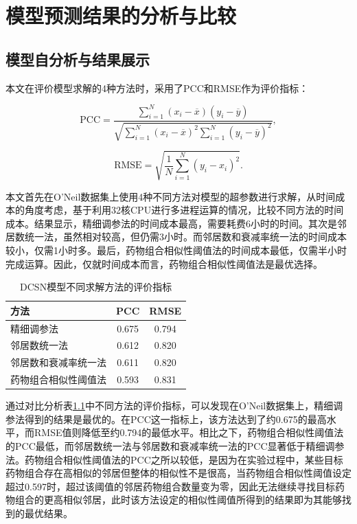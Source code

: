 \chapter{模型预测结果的分析与比较}
\label{chap:theory}

\section{模型自分析与结果展示}

本文在评价模型求解的4种方法时，采用了PCC和RMSE作为评价指标：

\begin{equation*}
\mathrm{PCC} = \frac{\sum_{i=1}^{N}(x_i-\overline{x})(y_i-\overline{y})}{\sqrt{\sum_{i=1}^{N}(x_i-\overline{x})^2\sum_{i=1}^{N}(y_i-\overline{y})^2}},
\end{equation*}

\begin{equation*}
\mathrm{RMSE} = \sqrt{\frac{1}{N} \sum_{i=1}^{N} (y_i - x_i)^2}.
\end{equation*}

本文首先在O'Neil数据集上使用4种不同方法对模型的超参数进行求解，从时间成本的角度考虑，基于利用32核CPU进行多进程运算的情况，比较不同方法的时间成本。结果显示，精细调参法的时间成本最高，需要耗费6小时的时间。其次是邻居数统一法，虽然相对较高，但仍需3小时。而邻居数和衰减率统一法的时间成本较小，仅需1小时多。最后，药物组合相似性阈值法的时间成本最低，仅需半小时完成运算。因此，仅就时间成本而言，药物组合相似性阈值法是最优选择。

\begin{table}[htbp]
  \centering
  \caption{DCSN模型不同求解方法的评价指标}
  \label{table:model-4m}
  \small
  \begin{tabular}{p{5cm}cc}
    \toprule
    方法 & PCC & RMSE \\
    \midrule
    精细调参法 & 0.675 & 0.794 \\
    邻居数统一法 & 0.612 & 0.820 \\
    邻居数和衰减率统一法 & 0.611 & 0.820 \\
    药物组合相似性阈值法 & 0.593 & 0.831 \\
    \bottomrule
  \end{tabular}
\end{table}

通过对比分析表\ref{table:model-4m}中不同方法的评价指标，可以发现在O'Neil数据集上，精细调参法得到的结果是最优的。在PCC这一指标上，该方法达到了约0.675的最高水平，而RMSE值则降低至约0.794的最低水平。相比之下，药物组合相似性阈值法的PCC最低，而邻居数统一法与邻居数和衰减率统一法的PCC显著低于精细调参法。药物组合相似性阈值法的PCC之所以较低，是因为在实验过程中，某些目标药物组合存在高相似的邻居但整体的相似性不是很高，当药物组合相似性阈值设定超过0.597时，超过该阈值的邻居药物组合数量变为零，因此无法继续寻找目标药物组合的更高相似邻居，此时该方法设定的相似性阈值所得到的结果即为其能够找到的最优结果。

